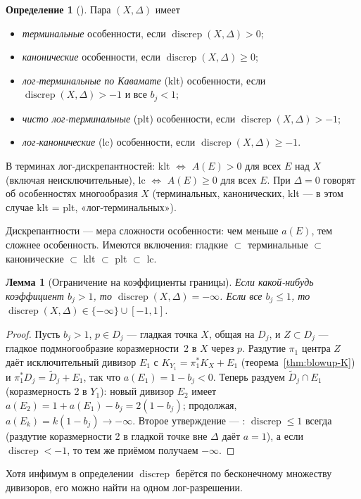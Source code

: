 \documentclass[11pt,a4paper]{article}
\theoremstyle{plain}
\newtheorem{lemma}[theorem]{Лемма}
\theoremstyle{definition}
\newtheorem{definition}[theorem]{Определение}
\theoremstyle{remark}
\DeclareMathOperator{\discrep}{discrep}
\begin{document}
\begin{definition}[{\cite[2.34]{KM}}]\label{def:klt}
Пара $(X,\Delta)$ имеет
\begin{itemize}
\item \emph{терминальные} особенности, если $\discrep(X,\Delta)>0$;
\item \emph{канонические} особенности, если $\discrep(X,\Delta)\ge0$;
\item \emph{лог-терминальные по Кавамате} (klt) особенности, если $\discrep(X,\Delta)>-1$ и все
$b_j<1$;
\item \emph{чисто лог-терминальные} (plt) особенности, если $\discrep(X,\Delta)>-1$;
\item \emph{лог-канонические} (lc) особенности, если $\discrep(X,\Delta)\ge-1$.
\end{itemize}
В терминах лог-дискрепантностей: klt $\iff$ $A(E)>0$ для всех $E$ над $X$ (включая
неисключительные), lc $\iff$ $A(E)\ge0$ для всех $E$. При $\Delta=0$ говорят об особенностях
многообразия $X$ (терминальных, канонических, klt --- в этом случае klt = plt, «лог-терминальных»).
\end{definition}

Дискрепантности --- мера сложности особенности: чем меньше $a(E)$, тем сложнее особенность. Имеются включения:
гладкие $\subset$ терминальные $\subset$ канонические $\subset$ klt $\subset$ plt $\subset$ lc.

\begin{lemma}[Ограничение на коэффициенты границы]\label{lem:coeff-le-1}
Если какой-нибудь коэффициент $b_j>1$, то $\discrep(X,\Delta)=-\infty$. Если все $b_j\le1$, то
$\discrep(X,\Delta)\in\{-\infty\}\cup[-1,1]$.
\end{lemma}
\begin{proof}
Пусть $b_j>1$, $p\in D_j$ --- гладкая точка $X$, общая на $D_j$, и $Z\subset D_j$ --- гладкое
подмногообразие коразмерности~2 в $X$ через $p$. Раздутие $\pi_1$ центра $Z$ даёт исключительный
дивизор $E_1$ с $K_{Y_1}=\pi_1^*K_X+E_1$ (теорема~\ref{thm:blowup-K}) и $\pi_1^*D_j=\tilde D_j+E_1$,
так что $a(E_1)=1-b_j<0$. Теперь раздуем $\tilde D_j\cap E_1$ (коразмерность 2 в $Y_1$): новый
дивизор $E_2$ имеет $a(E_2)=1+a(E_1)-b_j=2(1-b_j)$; продолжая, $a(E_k)=k(1-b_j)\to-\infty$.
Второе утверждение --- \cite[2.31]{KM}: $\discrep\le1$ всегда (раздутие коразмерности 2 в гладкой
точке вне $\Delta$ даёт $a=1$), а если $\discrep<-1$, то тем же приёмом получаем $-\infty$.
\end{proof}

Хотя инфимум в определении $\discrep$ берётся по бесконечному множеству дивизоров, его можно найти
на одном лог-разрешении.
\end{document}
